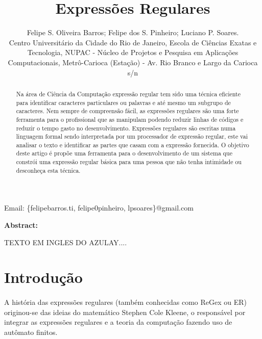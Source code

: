 \documentclass[10pt,a4paper]{article}
\title{Expressões Regulares }
\date{}
\begin{document}
\maketitle
\begin{center}
\author 
{Felipe S. Oliveira Barros; Felipe dos S. Pinheiro; Luciano P. Soares.\\
Centro Universitário da Cidade do Rio de Janeiro, Escola de Ciências Exatas e Tecnologia, NUPAC - Núcleo de Projetos e Pesquisa em Aplicações Computacionais,
Metrô-Carioca (Estação) - Av. Rio Branco e Largo da Carioca s/n}
\end{center}
\begin{center}
Email: \{felipebarros.ti, felipe0pinheiro, lpsoares\}@gmail.com
\end{center} 
\begin{abstract}
Na área de Ciência da Computação expressão regular tem sido uma técnica eficiente para identificar caracteres particulares ou palavras e até mesmo um subgrupo de caracteres. Nem sempre de compreensão fácil, as expressões regulares são uma forte ferramenta para o profissional que as manipulam podendo reduzir linhas de códigos e reduzir o tempo gasto no desenvolvimento. Expressões regulares são escritas numa linguagem formal sendo interpretada por um processador de expressão regular, este vai analisar o texto e identificar as partes que casam com a expressão fornecida. O objetivo deste artigo é propõe uma ferramenta para o desenvolvimento de um sistema que constrói uma expressão regular básica para uma pessoa que não tenha intimidade ou desconheça esta técnica.
\end{abstract}
\begin{center}
\bf{Abstract:}
\end{center}
\begin{center}
TEXTO EM INGLES DO AZULAY....
\end{center}
\section{Introdução}
\paragraph*{} A história das expressões regulares (também conhecidas como ReGex ou ER) originou-se das ideias do matemático Stephen Cole Kleene,  o responsável por integrar as expressões regulares e a teoria da computação fazendo uso de autômato finitos.
\end{document}
